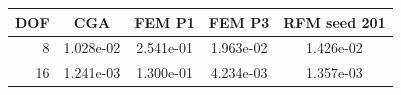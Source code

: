 \begin{tabular}{rcccc}
\toprule
DOF & CGA & FEM P1 & FEM P3 & RFM seed 201 \\
\midrule
8 & 1.028e-02 & 2.541e-01 & 1.963e-02 & 1.426e-02 \\
16 & 1.241e-03 & 1.300e-01 & 4.234e-03 & 1.357e-03 \\
\bottomrule
\end{tabular}
